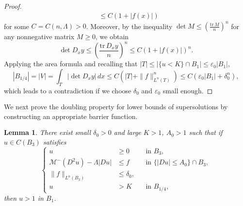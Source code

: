 \documentclass[11pt]{amsart}
\theoremstyle{plain}
\newtheorem{lemma}[theorem]{Lemma}
\theoremstyle{definition}
\numberwithin{equation}{section}
\begin{document}
\begin{proof}
\begin{equation*}
\begin{aligned}
   &\leq C(1+|f(x)|)
    \end{aligned}
\end{equation*}
for some $C=C(n, \Lambda)>0$. Moreover, by the inequality $\det M \leq \left( \frac{\mathrm{tr}\, M}{n}\right)^n$ for any nonnegative matrix $M \geq0$, we obtain
\begin{equation*}
	\det D_xy\leq \left(\frac{\mathrm{tr}\,{D_xy} }{n}\right)^n \leq C(1 +|f(x)|)^n.
\end{equation*}
Applying the area formula and recalling that $|T| \leq |\{ u<K\} \cap B_1| \leq \varepsilon_0|B_1| $,
\begin{equation*}
    |B_{1/4}| = |V| =\int_{T}|\det D_xy|\,dx \leq C(|T|+\|f\|_{L^n(T)}^n) \leq C(\varepsilon_0|B_1| +\delta_0^n),
\end{equation*}
which leads to a contradiction if we choose $\delta_0$ and $\varepsilon_0$ small enough.
\end{proof}

We next prove the doubling property for lower bounds of supersolutions by constructing an appropriate barrier function.
\begin{lemma}\label{A01}
    There exist small $\delta_0>0$ and large $K>1$, $A_0>1$ such that if  $u \in C(B_3)$ satisfies
    \begin{equation*}
    \left\{
    \begin{aligned}
        u &\geq 0 &&\text{in } B_3,\\
        \mathcal{M}^-(D^2u)-\Lambda|Du| &\leq f &&\text{in } \{|Du| \leq A_0\}\cap B_3, \\
        \|f\|_{L^n(B_3)} &\leq \delta_0, \\
        u&>K &&\text{in } B_{1/4},
    \end{aligned}
    \right.
    \end{equation*}
    then $u>1$ in $B_1$.
\end{lemma} 
\end{document}
